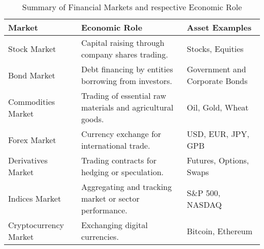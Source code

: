 \begin{table}[htb!]
\caption{Summary of Financial Markets and respective Economic Role}
\label{Tables:FinancialMarkets}
\centering
\footnotesize
\begin{tabularx}{\textwidth}{@{}lXl@{}}
\toprule
\textbf{Market} & \textbf{Economic Role} & \textbf{Asset Examples} \\
\midrule
Stock Market & Capital raising through company shares trading. & Stocks, Equities \\
\addlinespace
Bond Market & Debt financing by entities borrowing from investors. & Government and Corporate Bonds \\
\addlinespace
Commodities Market & Trading of essential raw materials and agricultural goods. & Oil, Gold, Wheat \\
\addlinespace
Forex Market & Currency exchange for international trade. & USD, EUR, JPY, GPB \\
\addlinespace
Derivatives Market & Trading contracts for hedging or speculation. & Futures, Options, Swaps \\
\addlinespace
Indices Market & Aggregating and tracking market or sector performance. & S\&P 500, NASDAQ \\
\addlinespace
Cryptocurrency Market & Exchanging digital currencies. & Bitcoin, Ethereum \\
\bottomrule
\end{tabularx}
\end{table}
